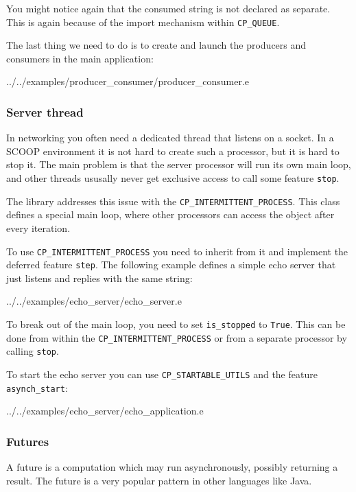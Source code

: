 \documentclass[a4paper,10pt]{report}
\begin{document}
You might notice again that the consumed string is not declared as separate.
This is again because of the import mechanism within \lstinline!CP_QUEUE!.

The last thing we need to do is to create and launch the producers and consumers in the main application:

 {../../examples/producer_consumer/producer_consumer.e}


\subsubsection{Server thread}

In networking you often need a dedicated thread that listens on a socket.
In a SCOOP environment it is not hard to create such a processor, but it is hard to stop it.
The main problem is that the server processor will run its own main loop, and other threads ususally never get exclusive access to call some feature \lstinline!stop!.

The library addresses this issue with the \lstinline!CP_INTERMITTENT_PROCESS!.
This class defines a special main loop, where other processors can access the object after every iteration.

To use \lstinline!CP_INTERMITTENT_PROCESS! you need to inherit from it and implement the deferred feature \lstinline!step!.
The following example defines a simple echo server that just listens and replies with the same string:

 {../../examples/echo_server/echo_server.e}

To break out of the main loop, you need to set \lstinline!is_stopped! to \lstinline!True!.
This can be done from within the \lstinline!CP_INTERMITTENT_PROCESS! or from a separate processor by calling \lstinline!stop!.

To start the echo server you can use \lstinline!CP_STARTABLE_UTILS! and the feature \lstinline!asynch_start!:

 {../../examples/echo_server/echo_application.e}

\subsubsection{Futures}

A future is a computation which may run asynchronously, possibly returning a result.
The future is a very popular pattern in other languages like Java.
\end{document}
